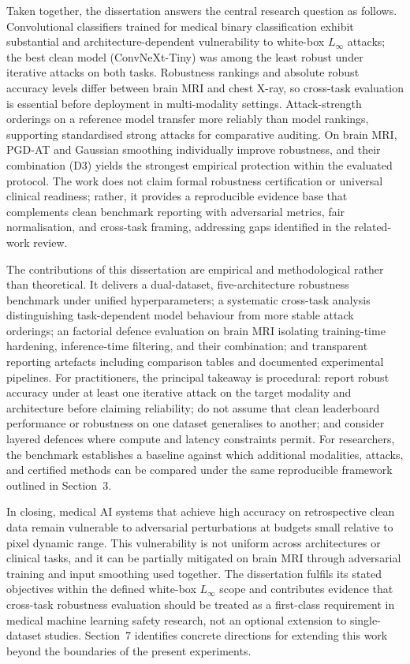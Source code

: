 \documentclass[12pt,a4paper,oneside]{report}
\begin{document}
Taken together, the dissertation answers the central research question as follows. Convolutional classifiers trained for medical binary classification exhibit substantial and architecture-dependent vulnerability to white-box $L_\infty$ attacks; the best clean model (ConvNeXt-Tiny) was among the least robust under iterative attacks on both tasks. Robustness rankings and absolute robust accuracy levels differ between brain MRI and chest X-ray, so cross-task evaluation is essential before deployment in multi-modality settings. Attack-strength orderings on a reference model transfer more reliably than model rankings, supporting standardised strong attacks for comparative auditing. On brain MRI, PGD-AT and Gaussian smoothing individually improve robustness, and their combination (D3) yields the strongest empirical protection within the evaluated protocol. The work does not claim formal robustness certification or universal clinical readiness; rather, it provides a reproducible evidence base that complements clean benchmark reporting with adversarial metrics, fair normalisation, and cross-task framing, addressing gaps identified in the related-work review.

The contributions of this dissertation are empirical and methodological rather than theoretical. It delivers a dual-dataset, five-architecture robustness benchmark under unified hyperparameters; a systematic cross-task analysis distinguishing task-dependent model behaviour from more stable attack orderings; an factorial defence evaluation on brain MRI isolating training-time hardening, inference-time filtering, and their combination; and transparent reporting artefacts including comparison tables and documented experimental pipelines. For practitioners, the principal takeaway is procedural: report robust accuracy under at least one iterative attack on the target modality and architecture before claiming reliability; do not assume that clean leaderboard performance or robustness on one dataset generalises to another; and consider layered defences where compute and latency constraints permit. For researchers, the benchmark establishes a baseline against which additional modalities, attacks, and certified methods can be compared under the same reproducible framework outlined in Section~3.

In closing, medical AI systems that achieve high accuracy on retrospective clean data remain vulnerable to adversarial perturbations at budgets small relative to pixel dynamic range. This vulnerability is not uniform across architectures or clinical tasks, and it can be partially mitigated on brain MRI through adversarial training and input smoothing used together. The dissertation fulfils its stated objectives within the defined white-box $L_\infty$ scope and contributes evidence that cross-task robustness evaluation should be treated as a first-class requirement in medical machine learning safety research, not an optional extension to single-dataset studies. Section~7 identifies concrete directions for extending this work beyond the boundaries of the present experiments.
\end{document}
